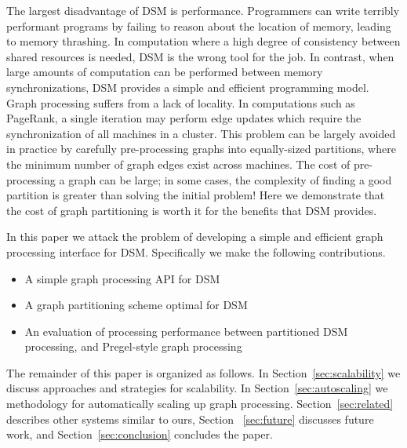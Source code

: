 The largest disadvantage of DSM is performance. Programmers can write
terribly performant programs by failing to reason about the location
of memory, leading to memory thrashing. In computation where a high
degree of consistency between shared resources is needed, DSM is the 
wrong tool for the job. In contrast, when large amounts of computation can be
performed between memory synchronizations, DSM provides a simple and
efficient programming model. Graph processing suffers from a lack of
locality. In computations such as PageRank, a single iteration may
perform edge updates which require the synchronization of all
machines in a cluster. This problem can be largely avoided in practice
by carefully pre-processing graphs into equally-sized partitions, where 
the minimum number of graph edges exist across machines. The cost of pre-processing a
graph can be large; in some cases, the complexity of finding a good
partition is greater than solving the initial problem! Here we
demonstrate that the cost of graph partitioning is worth it for the
benefits that DSM provides.

In this paper we attack the problem of developing a simple and
efficient graph processing interface for DSM. Specifically we make the
following contributions.

\begin{itemize}
        \item A simple graph processing API for DSM
        \item A graph partitioning scheme optimal for DSM
        \item An evaluation of processing performance between partitioned DSM processing, and Pregel-style graph processing
\end{itemize}

The remainder of this paper is organized as follows. In
Section~\ref{sec:scalability} we discuss approaches and strategies for 
scalability. In Section~\ref{sec:autoscaling} we methodology for
automatically scaling up graph processing. Section~\ref{sec:related} 
describes other systems similar to ours, Section ~\ref{sec:future} discusses
future work, and Section~\ref{sec:conclusion} concludes the paper.




